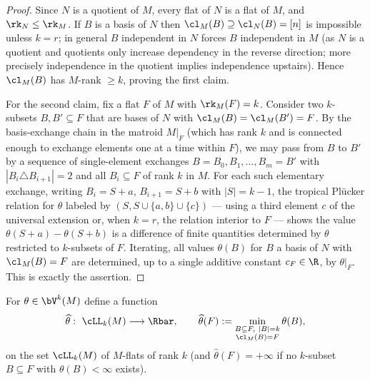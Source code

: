 \begin{proof}
Since $N$ is a quotient of $M$, every flat of $N$ is a flat of $M$, and
$\rk_N\le \rk_M$. If $B$ is a basis of $N$ then $\cl_M(B)\supseteq \cl_N(B)=[n]$
is impossible unless $k=r$; in general $B$ independent in $N$ forces $B$
independent in $M$ (as $N$ is a quotient and quotients only increase dependency
in the reverse direction; more precisely independence in the quotient implies
independence upstairs). Hence $\cl_M(B)$ has $M$-rank $\ge k$, proving the first
claim.

For the second claim, fix a flat $F$ of $M$ with $\rk_M(F)=k$. Consider two
$k$-subsets $B,B'\subseteq F$ that are bases of $N$ with $\cl_M(B)=\cl_M(B')=F$.
By the basis-exchange chain in the matroid $M|_F$ (which has rank $k$ and is
connected enough to exchange elements one at a time within $F$), we may pass
from $B$ to $B'$ by a sequence of single-element exchanges
$B=B_0,B_1,\dots,B_m=B'$ with $|B_i\triangle B_{i+1}|=2$ and all $B_i\subseteq F$
of rank $k$ in $M$. For each such elementary exchange, writing
$B_i=S+a$, $B_{i+1}=S+b$ with $|S|=k-1$, the tropical Pl\"ucker relation for
$\theta$ labeled by $(S, S\cup\{a,b\}\cup\{c\})$ — using a third element $c$ of
the universal extension or, when $k=r$, the relation interior to $F$ — shows the
value $\theta(S+a)-\theta(S+b)$ is a difference of finite quantities determined
by $\theta$ restricted to $k$-subsets of $F$. Iterating, all values $\theta(B)$
for $B$ a basis of $N$ with $\cl_M(B)=F$ are determined, up to a single additive
constant $c_F\in\R$, by $\theta|_F$. This is exactly the assertion.
\end{proof}

\begin{definition}\label{def:flat-function}
For $\theta\in\bV^k(M)$ define a function
\[
\widehat\theta:\ \cLL_k(M)\longrightarrow\Rbar,\qquad
\widehat\theta(F):=\min_{\substack{B\subseteq F,\ |B|=k\\ \cl_M(B)=F}}\theta(B),
\]
on the set $\cLL_k(M)$ of $M$-flats of rank $k$ (and $\widehat\theta(F)=+\infty$
if no $k$-subset $B\subseteq F$ with $\theta(B)<\infty$ exists).
\end{definition}


